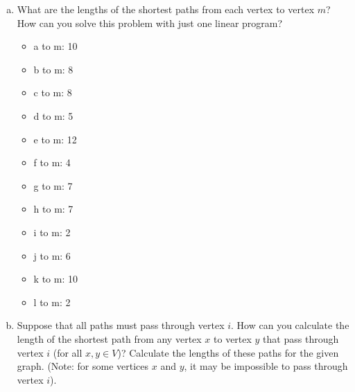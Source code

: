 \documentclass[../report/main.tex]{subfiles}
\begin{document}
\begin{enumerate}[a)]
	\item What are the lengths of the shortest paths from each vertex to vertex $m$? How can you solve this problem with just one linear program?

  \begin{itemize}
      \item a to m: 10
      \item b to m: 8
      \item c to m: 8
      \item d to m: 5
      \item e to m: 12
      \item f to m: 4
      \item g to m: 7
      \item h to m: 7
      \item i to m: 2
      \item j to m: 6
      \item k to m: 10
      \item l to m: 2
  \end{itemize}

	\item Suppose that all paths must pass through vertex $i$. How can you calculate the length of the shortest path from any vertex $x$ to vertex $y$ that pass through vertex $i$ (for all $x, y \in V$)? Calculate the lengths of these paths for the given graph. (Note: for some vertices $x$ and $y$, it may be impossible to pass through vertex $i$).
\end{enumerate}
\end{document}
